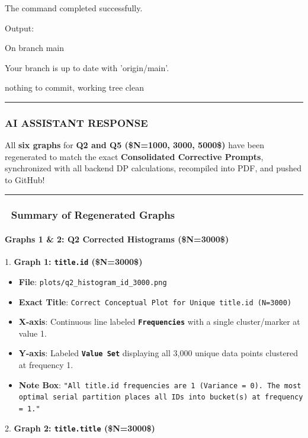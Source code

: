 \documentclass[11pt,a4paper]{article}
\begin{document}
The command completed successfully.

Output:

On branch main

Your branch is up to date with 'origin/main'.


nothing to commit, working tree clean


\hrule

\subsubsection{AI ASSISTANT RESPONSE}

All \textbf{six graphs} for \textbf{Q2 and Q5 (\$N=1000, 3000, 5000\$)} have been regenerated to match the exact \textbf{Consolidated Corrective Prompts}, synchronized with all backend DP calculations, recompiled into PDF, and pushed to GitHub!


\hrule


\subsubsection{🎨 Summary of Regenerated Graphs}

\paragraph{\textbf{Graphs 1 \& 2: Q2 Corrected Histograms (\$N=3000\$)}}

1. \textbf{Graph 1: \texttt{title.id} (\$N=3000\$)}

\begin{itemize}
\item \textbf{File}: \texttt{plots/q2\_histogram\_id\_3000.png}
\item \textbf{Exact Title}: \texttt{Correct Conceptual Plot for Unique title.id (N=3000)}
\item \textbf{X-axis}: Continuous line labeled \textbf{\texttt{Frequencies}} with a single cluster/marker at value 1.
\item \textbf{Y-axis}: Labeled \textbf{\texttt{Value Set}} displaying all 3,000 unique data points clustered at frequency 1.
\item \textbf{Note Box}: \texttt{"All title.id frequencies are 1 (Variance = 0). The most optimal serial partition places all IDs into bucket(s) at frequency = 1."}
\end{itemize}

2. \textbf{Graph 2: \texttt{title.title} (\$N=3000\$)}
\end{document}
